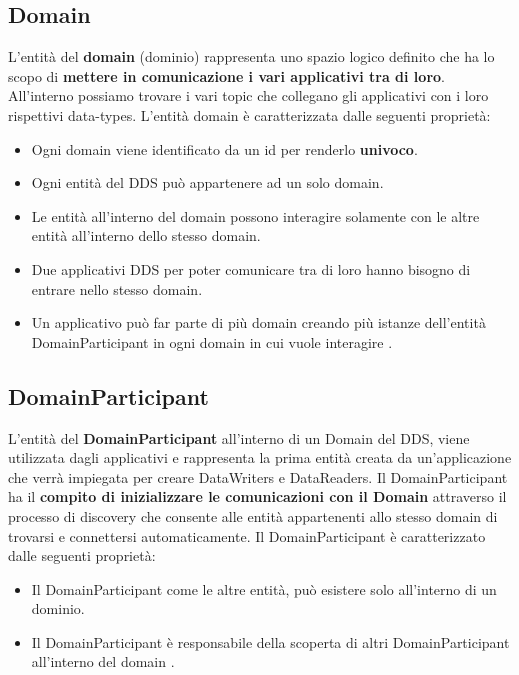 \subsection{Domain}
L'entità del \textbf{domain} (dominio) rappresenta uno spazio logico definito che
ha lo scopo di \textbf{mettere in comunicazione i vari applicativi tra di loro}.
All'interno possiamo trovare i vari topic che collegano gli applicativi
con i loro rispettivi data-types.
L'entità domain è caratterizzata dalle seguenti proprietà:
\begin{itemize}
    \item Ogni domain viene identificato da un id 
    per renderlo \textbf{univoco}.
    \item Ogni entità del DDS può appartenere
    ad un solo domain.
    \item Le entità all'interno del domain possono interagire
    solamente con le altre entità all'interno dello stesso domain.
    \item Due applicativi DDS per poter comunicare tra di loro
    hanno bisogno di entrare nello stesso domain.
    \item Un applicativo può far parte di più domain creando 
    più istanze dell'entità DomainParticipant in ogni
    domain in cui vuole interagire \cite{domainrti}.
\end{itemize}


\subsection{DomainParticipant}
L'entità del \textbf{DomainParticipant} all'interno di un Domain del DDS,
viene utilizzata dagli applicativi e 
rappresenta la prima entità creata da un'applicazione che verrà 
impiegata per creare DataWriters e DataReaders. 
Il DomainParticipant ha il \textbf{compito di inizializzare
le comunicazioni con il Domain} attraverso 
il processo di discovery che consente alle entità appartenenti allo 
stesso domain di trovarsi e connettersi automaticamente.
Il DomainParticipant è caratterizzato dalle seguenti proprietà:
\begin{itemize}
    \item Il DomainParticipant come le altre entità, può 
    esistere solo all'interno di un dominio.
    \item Il DomainParticipant è responsabile della scoperta di altri
    DomainParticipant all'interno del domain \cite{domainparticipantrti}.
\end{itemize}


